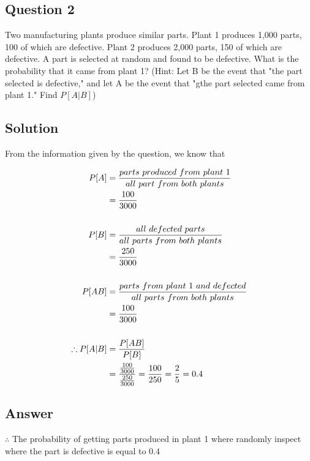 \documentclass[12pt]{report} %
\begin{document}
\newpage

\subsection*{Question 2}

Two manufacturing plants produce similar parts. Plant 1 produces 1,000
parts, 100 of which are defective. Plant 2 produces 2,000 parts, 150
of which are defective. A part is selected at random and found to be
defective. What is the probability that it came from plant 1?
(Hint: Let B be the event that "the part selected is defective," and
let A be the event that "gthe part selected came from plant 1." Find
$P[A|B]$)

\subsection*{Solution}

From the information given by the question, we know that

\begin{equation} \notag
\begin{split}
P[A] & = \frac{parts\ produced\ from\ plant\ 1}{all\ part\ from\ both\ plants} \\
& = \frac{100}{3000} \\
\\
P[B] & = \frac{all\ defected\ parts}{all\ parts\ from\ both\ plants} \\
& = \frac{250}{3000} \\
\\
P[AB] & = \frac{parts\ from\ plant\ 1\ and\ defected}{all\ parts\ from\ both\ plants} \\
& = \frac{100}{3000} \\
\\
\therefore P[A|B] & = \frac{P[AB]}{P[B]} \\ & = \frac{\frac{100}{3000}}{\frac{250}{3000}} = \frac{100}{250} = \frac{2}{5} = 0.4
\end{split}
\end{equation}

\subsection*{Answer}
$\therefore$ The probability of getting parts produced in plant 1 where
randomly inspect where the part is defective is equal to $0.4$
\end{document}
